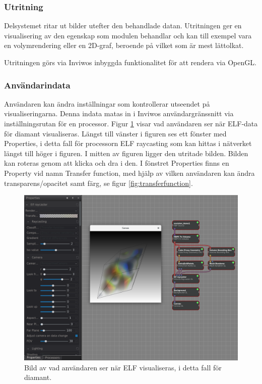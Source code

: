 \documentclass[a4paper,12pt]{article}
\begin{document}
\subsubsection{Utritning}
Delsystemet ritar ut bilder utefter den behandlade datan. Utritningen ger en visualisering av den egenskap som modulen behandlar och kan till exempel vara en volymrendering eller en 2D-graf, beroende på vilket som är mest lättolkat. 

Utritningen görs via Inviwos inbyggda funktionalitet för att rendera via OpenGL. 

\subsubsection{Användarindata}
Användaren kan ändra inställningar som kontrollerar utseendet på visualiseringarna.
Denna indata matas in i Inviwos användargränssnitt via inställningsrutan för en processor. Figur \ref{fig:interface} visar vad användaren ser när ELF-data för diamant visualiseras. Längst till vänster i figuren ses ett fönster med Properties, i detta fall för processorn ELF raycasting som kan hittas i nätverket längst till höger i figuren. I mitten av figuren ligger den utritade bilden. Bilden kan roteras genom att klicka och dra i den. I fönstret Properties finns en Property vid namn Transfer function, med hjälp av vilken användaren kan ändra transparens/opacitet samt färg, se figur \ref{fig:transferfunction}.

\begin{figure}[H]
	\centering
	\includegraphics[scale=0.3]{inviwo_interface_elf.png}
	\caption{Bild av vad användaren ser när ELF visualiseras, i detta fall för diamant.}
	\label{fig:interface}
\end{figure}
\end{document}
